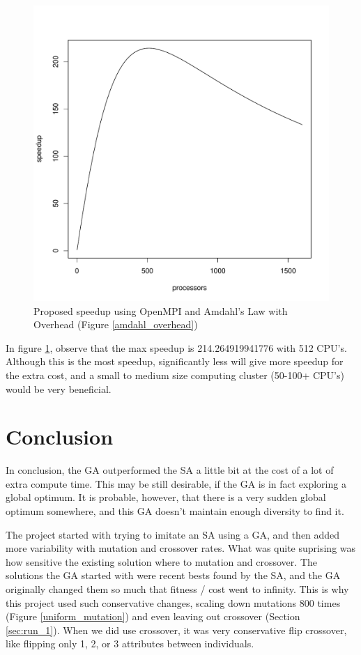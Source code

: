 \begin{figure}[!h]
	\begin{center}
		\includegraphics[width=120mm]{images/amdahl_graph.pdf}
               	\caption{Proposed speedup using OpenMPI and Amdahl's Law with Overhead (Figure \ref{amdahl_overhead}) }
                \label{speedup}
        \end{center}
\end{figure}

In figure \ref{speedup}, observe that the max speedup is 214.264919941776 with 
512 CPU's. Although this is the most speedup, significantly less will give more 
speedup for the extra cost, and a small to medium size computing cluster 
(50-100+ CPU's) would be very beneficial.

\section{Conclusion}
In conclusion, the GA outperformed the SA a little bit at the cost of a lot
of extra compute time. This may be still desirable, if the GA is in fact
exploring a global optimum. It is probable, however, that there is a very 
sudden global optimum somewhere, and this GA doesn't maintain enough diversity
to find it.

The project started with trying to imitate an SA using a GA, and then added 
more variability with mutation and crossover rates. What was quite suprising
was how sensitive the existing solution where to mutation and crossover.
The solutions the GA started with were recent bests found by the SA, and 
the GA originally changed them so much that fitness / cost went to infinity.
This is why this project used such conservative changes, scaling down 
mutations 800 times (Figure \ref{uniform_mutation}) and even leaving out 
crossover (Section \ref{sec:run_1}). When we did use crossover, it was very
conservative flip crossover, like flipping only 1, 2, or 3 attributes 
between individuals.

